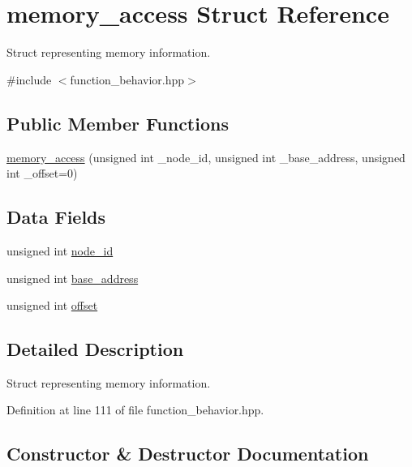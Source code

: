 \hypertarget{structmemory__access}{}\section{memory\+\_\+access Struct Reference}
\label{structmemory__access}


Struct representing memory information.  




{\ttfamily \#include $<$function\+\_\+behavior.\+hpp$>$}

\subsection*{Public Member Functions}
\begin{DoxyCompactItemize}
\item 
\hyperlink{structmemory__access_a99e86917a9140fae1f82a9c29eebf0f8}{memory\+\_\+access} (unsigned int \+\_\+node\+\_\+id, unsigned int \+\_\+base\+\_\+address, unsigned int \+\_\+offset=0)
\end{DoxyCompactItemize}
\subsection*{Data Fields}
\begin{DoxyCompactItemize}
\item 
unsigned int \hyperlink{structmemory__access_a6797d28df5786ff0a56b98dd7c440ab1}{node\+\_\+id}
\item 
unsigned int \hyperlink{structmemory__access_aea0ee31948f3811cfb5e6f8de84000c5}{base\+\_\+address}
\item 
unsigned int \hyperlink{structmemory__access_a1201bfcc141350e99df9bd0bb7a5bb42}{offset}
\end{DoxyCompactItemize}


\subsection{Detailed Description}
Struct representing memory information. 

Definition at line 111 of file function\+\_\+behavior.\+hpp.



\subsection{Constructor \& Destructor Documentation}
\mbox{\label{structmemory__access_a99e86917a9140fae1f82a9c29eebf0f8}} 
